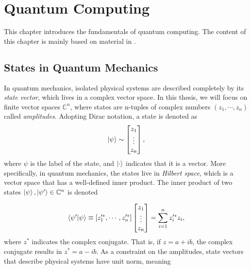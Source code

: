 \chapter{Quantum Computing}\label{chap:QuantumComputing}
This chapter introduces the fundamentals of quantum computing. The content of this chapter is mainly based on material in \citet{NielsenQuantum}.


\section{States in Quantum Mechanics}\label{sec:IntroQM}
In quantum mechanics, isolated physical systems are described completely by its \emph{state vector}, which lives in a complex vector space. In this thesis, we will focus on finite vector spaces $\mathbb{C}^n$, where states are n-tuples of complex numbers $(z_1, \cdots, z_n)$ called \emph{amplitudes}. Adopting Dirac notation, a state is denoted as 
\begin{equation}
    \ket{\psi} \sim \begin{bmatrix}
           z_{1} \\
           \vdots \\
           z_{n}
         \end{bmatrix},
\end{equation}
where $\psi$ is the label of the state, and $\ket{\cdot}$ indicates that it is a vector. More specifically, in quantum mechanics, the states live in \emph{Hilbert space}, which is a vector space that has a well-defined inner product. The inner product of two states $\ket{\psi}, \ket{\psi'} \in \mathbb{C}^n$ is denoted 

\begin{equation}
    \braket{\psi'}{\psi} \equiv [z_1'^*, \cdots, z_n'^*] 
    \begin{bmatrix}
        z_{1} \\
        \vdots \\
        z_{n}
    \end{bmatrix}
    = \sum_{i=1}^{n} z_i'^* z_i, 
\end{equation}
where $z^*$ indicates the complex conjugate. That is, if $z = a + ib$, the complex conjugate results in $z^* = a - ib$. As a constraint on the amplitudes, state vectors that describe physical systems have unit norm, meaning 

